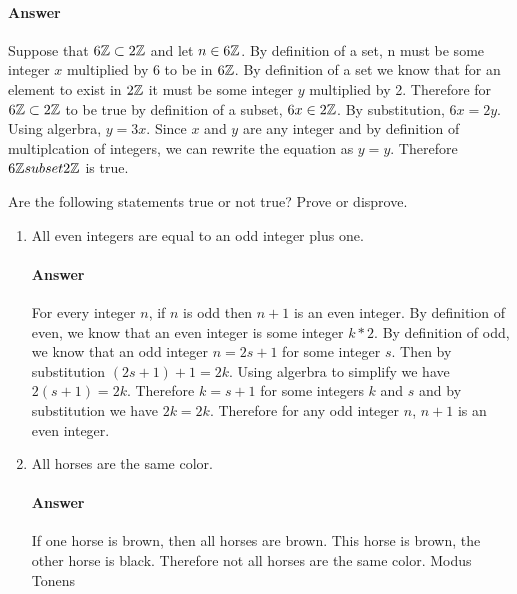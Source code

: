 \documentclass{article}
\begin{document}
\paragraph{Answer}

Suppose that $6{\mathbb Z} \subset 2{\mathbb Z}$ and let $n \in 6{\mathbb Z}$. By definition of a set, n must be some integer $x$ multiplied by 6 to be in $6{\mathbb Z}$. By definition of a set we know that for an element to exist in $2{\mathbb Z}$ it must be some integer $y$ multiplied by 2. Therefore for $6{\mathbb Z} \subset 2{\mathbb Z}$ to be true by definition of a subset, $6x \in 2{\mathbb Z}$. By substitution, $6x=2y$. Using algerbra, $y=3x$. Since $x$ and $y$ are any integer and by definition of multiplcation of integers, we can rewrite the equation as $y=y$. Therefore $6{\mathbb Z} subset 2{\mathbb Z}$ is true.


Are the following statements true or not true?    Prove or disprove.

\begin{enumerate}

    \item All even integers are equal to an odd integer plus one.

        \paragraph{Answer}
       For every integer $n$, if $n$ is odd then $n+1$ is an even integer. By definition of even, we know that an even integer is some integer $k*2$. By definition of odd, we know that an odd integer $n=2s+1$ for some integer $s$. Then by substitution $(2s+1)+1=2k$. Using algerbra to simplify we have $2(s+1)=2k$. Therefore $k=s+1$ for some integers $k$ and $s$ and by substitution we have $2k=2k$. Therefore for any odd integer $n$, $n+1$ is an even integer.

    \item All horses are the same color.

        \paragraph{Answer}
        If one horse is brown, then all horses are brown. This horse is brown, the other horse is
black. Therefore not all horses are the same color. Modus Tonens


\end{enumerate}
\end{document}
